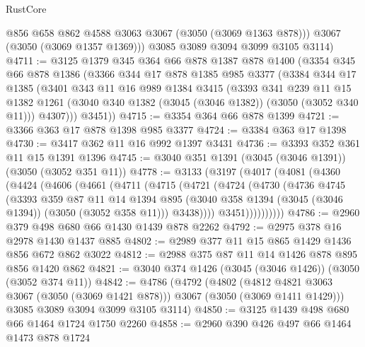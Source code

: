 \begin{lexlean}{RustCore}
\begin{coremodule}
          @856
          @658
          @862
          @4588
          @3063
          @3067
          (@3050 (@3069 @1363 @878)))
        @3067
        (@3050 (@3069 @1357 @1369)))
      @3085
      @3089
      @3094
      @3099
      @3105
      @3114)
@4711 := @3125
    @1379
    @345
    @364
    @66
    @878
    @1387
    @878
    @1400
    (@3354
      @345
      @66
      @878
      @1386
      (@3366
        @344
        @17
        @878
        @1385
        @985
        @3377
        (@3384
          @344
          @17
          @1385
          (@3401
            @343
            @11
            @16
            @989
            @1384
            @3415
            (@3393
              @341
              @239
              @11
              @15
              @1382
              @1261
              (@3040 @340 @1382 (@3045 (@3046 @1382)) (@3050 (@3052 @340 @11)))
              @4307)))
        @3451))
@4715 := @3354 @364 @66 @878 @1399
@4721 := @3366 @363 @17 @878 @1398 @985 @3377
@4724 := @3384 @363 @17 @1398
@4730 := @3417 @362 @11 @16 @992 @1397 @3431
@4736 := @3393 @352 @361 @11 @15 @1391 @1396
@4745 := @3040 @351 @1391 (@3045 (@3046 @1391)) (@3050 (@3052 @351 @11))
@4778 := @3133
    (@3197
      (@4017
        (@4081
          (@4360
            (@4424
              (@4606
                (@4661
                  (@4711
                    (@4715
                      (@4721
                        (@4724
                          (@4730
                            (@4736
                              @4745
                              (@3393
                                @359
                                @87
                                @11
                                @14
                                @1394
                                @895
                                (@3040 @358 @1394 (@3045 (@3046 @1394)) (@3050 (@3052 @358 @11)))
                                @3438))))
                        @3451))))))))))
@4786 := @2960 @379 @498 @680 @66 @1430 @1439 @878 @2262
@4792 := @2975 @378 @16 @2978 @1430 @1437 @885
@4802 := @2989 @377 @11 @15 @865 @1429 @1436 @856 @672 @862 @3022
@4812 := @2988 @375 @87 @11 @14 @1426 @878 @895 @856 @1420 @862
@4821 := @3040 @374 @1426 (@3045 (@3046 @1426)) (@3050 (@3052 @374 @11))
@4842 := @4786
    (@4792
      (@4802 (@4812 @4821 @3063 @3067 (@3050 (@3069 @1421 @878))) @3067 (@3050 (@3069 @1411 @1429)))
      @3085
      @3089
      @3094
      @3099
      @3105
      @3114)
@4850 := @3125 @1439 @498 @680 @66 @1464 @1724 @1750 @2260
@4858 := @2960 @390 @426 @497 @66 @1464 @1473 @878 @1724

\end{coremodule}
\end{lexlean}
